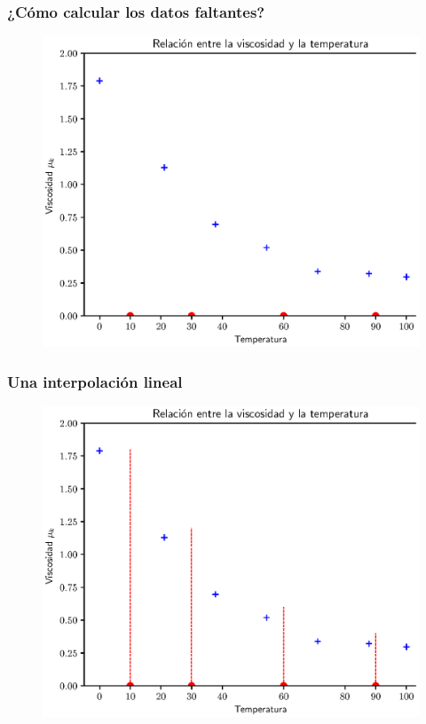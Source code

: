 \documentclass[12pt]{beamer}
\begin{document}
\begin{frame}
\frametitle{¿Cómo calcular los datos faltantes?}
\begin{figure}
    \centering
    \includegraphics[scale=0.575]{Imagenes/Intro_Interpolacion_02.eps}
\end{figure}
\end{frame}
\begin{frame}
\frametitle{Una interpolación lineal}
\begin{figure}
    \centering
    \includegraphics[scale=0.575]{Imagenes/Intro_Interpolacion_03.eps}
\end{figure}
\end{frame}
\end{document}

